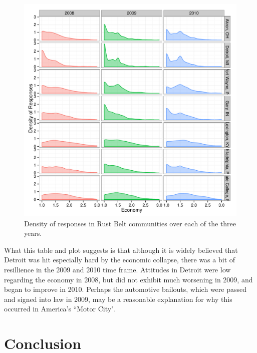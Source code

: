 \documentclass[11pt]{article}\usepackage{knitr}
\begin{document}
\begin{knitrout}
\color{fgcolor}\begin{figure}[H]


{\centering \includegraphics[width=\maxwidth]{figure/rb_one} 

}

\caption[Density of responses in Rust Belt communities over each of the three years]{Density of responses in Rust Belt communities over each of the three years.\label{fig:rb_one}}
\end{figure}


\end{knitrout}


What this table and plot suggests is that although it is widely believed that Detroit was hit especially hard by the economic collapse, there was a bit of resillience in the 2009 and 2010 time frame. Attitudes in Detroit were low regarding the economy in 2008, but did not exhibit much worsening in 2009, and began to improve in 2010. Perhaps the automotive bailouts, which were passed and signed into law in 2009, may be a reasonable explanation for why this occurred in America's ``Motor City".


\section{Conclusion}
\end{document}
